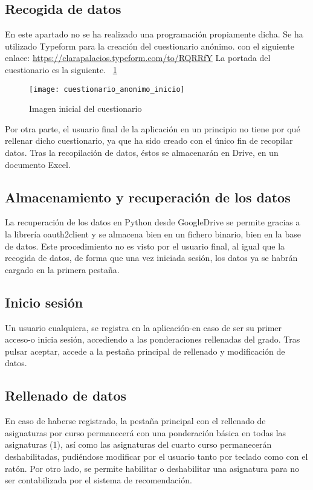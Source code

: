 \subsection{Recogida de datos}
En este apartado no se ha realizado una programación propiamente dicha. Se ha utilizado Typeform para la creación del cuestionario anónimo. con el siguiente enlace: \url{https://clarapalacios.typeform.com/to/RQRRfY}
La portada del cuestionario es la siguiente. 
~\ref{fig:D.1.1}
\begin{figure}[h]
\centering
\texttt{[image: cuestionario\_anonimo\_inicio]}
\caption{Imagen inicial del cuestionario}
\label{fig:D.1.1}
\end{figure}
Por otra parte, el usuario final de la aplicación en un principio no tiene por qué rellenar dicho cuestionario, ya que ha sido creado con el único fin de recopilar datos. 
Tras la recopilación de datos, éstos se almacenarán en Drive, en un documento Excel. 
\subsection{Almacenamiento y recuperación de los datos}
La recuperación de los datos en Python desde GoogleDrive se permite gracias a la librería oauth2client y se almacena bien en un fichero binario, bien en la base de datos. 
Este procedimiento no es visto por el usuario final, al igual que la recogida de datos, de forma que una vez iniciada sesión, los datos ya se habrán cargado en la primera pestaña. 

\subsection{Inicio sesión}
Un usuario cualquiera, se registra en la aplicación-en caso de ser su primer acceso-o inicia sesión, accediendo a las ponderaciones rellenadas del grado.  Tras pulsar aceptar, accede a la pestaña principal de rellenado y modificación de datos.

\subsection{Rellenado de datos}
En caso de haberse registrado, la pestaña principal con el rellenado de asignaturas por curso permanecerá con una ponderación básica en todas las asignaturas (1), así como las asignaturas del cuarto curso permanecerán deshabilitadas, pudiéndose modificar por el usuario tanto por teclado como con el ratón. Por otro lado, se permite habilitar o deshabilitar una asignatura para no ser contabilizada por el sistema de recomendación.  
 
